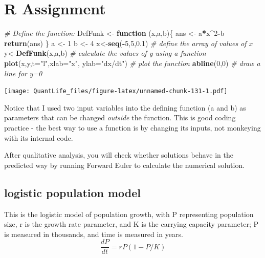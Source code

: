\documentclass[
]{book}
\newenvironment{Shaded}{\begin{snugshade}}{\end{snugshade}}
\newcommand{\CommentTok}[1]{\textcolor[rgb]{0.56,0.35,0.01}{\textit{#1}}}
\newcommand{\ControlFlowTok}[1]{\textcolor[rgb]{0.13,0.29,0.53}{\textbf{#1}}}
\newcommand{\DataTypeTok}[1]{\textcolor[rgb]{0.13,0.29,0.53}{#1}}
\newcommand{\DecValTok}[1]{\textcolor[rgb]{0.00,0.00,0.81}{#1}}
\newcommand{\FloatTok}[1]{\textcolor[rgb]{0.00,0.00,0.81}{#1}}
\newcommand{\KeywordTok}[1]{\textcolor[rgb]{0.13,0.29,0.53}{\textbf{#1}}}
\newcommand{\NormalTok}[1]{#1}
\newcommand{\OperatorTok}[1]{\textcolor[rgb]{0.81,0.36,0.00}{\textbf{#1}}}
\newcommand{\StringTok}[1]{\textcolor[rgb]{0.31,0.60,0.02}{#1}}
\theoremstyle{definition}
\theoremstyle{definition}
\theoremstyle{definition}
\theoremstyle{remark}
\begin{document}
\hypertarget{r-assignment-6}{%
\section{R Assignment}\label{r-assignment-6}}

\begin{Shaded}
\begin{Highlighting}[]
\CommentTok{\# Define the function:}
\NormalTok{DefFunk \textless{}{-}}\StringTok{ }\ControlFlowTok{function}\NormalTok{ (x,a,b)\{}
\NormalTok{  ans \textless{}{-}}\StringTok{ }\NormalTok{a}\OperatorTok{*}\NormalTok{x}\OperatorTok{\^{}}\DecValTok{2}\OperatorTok{{-}}\NormalTok{b}
  \KeywordTok{return}\NormalTok{(ans)}
\NormalTok{\}  }
\NormalTok{a \textless{}{-}}\StringTok{ }\DecValTok{1}
\NormalTok{b \textless{}{-}}\StringTok{ }\DecValTok{4}
\NormalTok{x\textless{}{-}}\KeywordTok{seq}\NormalTok{(}\OperatorTok{{-}}\DecValTok{5}\NormalTok{,}\DecValTok{5}\NormalTok{,}\FloatTok{0.1}\NormalTok{) }\CommentTok{\# define the array of values of x}
\NormalTok{y\textless{}{-}}\KeywordTok{DefFunk}\NormalTok{(x,a,b) }\CommentTok{\# calculate the values of y using a function}
\KeywordTok{plot}\NormalTok{(x,y,}\DataTypeTok{t=}\StringTok{"l"}\NormalTok{,}\DataTypeTok{xlab=}\StringTok{"x"}\NormalTok{, }\DataTypeTok{ylab=}\StringTok{"dx/dt"}\NormalTok{) }\CommentTok{\# plot the function}
\KeywordTok{abline}\NormalTok{(}\DecValTok{0}\NormalTok{,}\DecValTok{0}\NormalTok{) }\CommentTok{\# draw a line for y=0}
\end{Highlighting}
\end{Shaded}

\texttt{[image: QuantLife\_files/figure-latex/unnamed-chunk-131-1.pdf]}

Notice that I used two input variables into the defining function (a and b) as parameters that can be changed \emph{outside} the function. This is good coding practice - the best way to use a function is by changing its inputs, not monkeying with its internal code.

After qualitative analysis, you will check whether solutions behave in the predicted way by running Forward Euler to calculate the numerical solution.

\hypertarget{logistic-population-model}{%
\subsection{logistic population model}\label{logistic-population-model}}

This is the logistic model of population growth, with P representing population size, r is the growth rate parameter, and K is the carrying capacity parameter; P is measured in thousands, and time is measured in years.
\[ \frac{dP}{dt} = rP(1-P/K) \]
\end{document}
